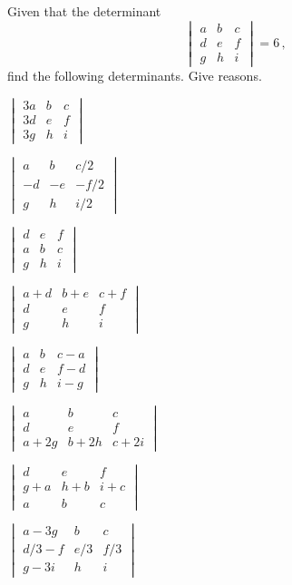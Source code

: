 \begin{exercise} \label{ex:} 
Given that the determinant
\begin{equation*}
\begin{vmatrix} a&b&c\\d&e&f\\g&h&i \end{vmatrix}=6\,,
\end{equation*}
find the following determinants.  Give reasons.
\begin{parts}
\item \(\begin{vmatrix} 3a&b&c\\3d&e&f\\3g&h&i \end{vmatrix}\)

\item \(\begin{vmatrix} a&b&c/2\\-d&-e&-f/2\\g&h&i/2 \end{vmatrix}\)

\item \(\begin{vmatrix} d&e&f\\a&b&c\\g&h&i \end{vmatrix}\)

\item \(\begin{vmatrix} a+d&b+e&c+f\\d&e&f\\g&h&i \end{vmatrix}\)

\item \(\begin{vmatrix} a&b&c-a\\d&e&f-d\\g&h&i-g \end{vmatrix}\)

\item \(\begin{vmatrix} a&b&c\\d&e&f\\a+2g&b+2h&c+2i \end{vmatrix}\)

\item \(\begin{vmatrix} d&e&f\\g+a&h+b&i+c\\a&b&c \end{vmatrix}\)

\item \(\begin{vmatrix} a-3g&b&c\\d/3-f&e/3&f/3\\g-3i&h&i \end{vmatrix}\)

\end{parts}
\end{exercise}





